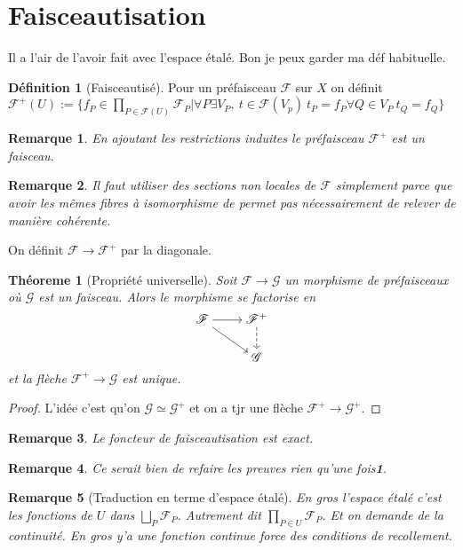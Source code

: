 \documentclass[a4paper,12pt]{book}
\newcommand{\F}{\mathscr F}
\newcommand{\G}{\mathscr{G}}
\theoremstyle{plain}
\newtheorem{thm}[subsection]{Théoreme}
\newtheorem{rem}{Remarque}
\theoremstyle{definition}
\newtheorem{defn}[subsection]{Définition}
\theoremstyle{remark}
\begin{document}
\section{Faisceautisation}
Il a l'air de l'avoir fait avec l'espace étalé. Bon je peux garder
ma déf habituelle. 
\begin{defn}[Faisceautisé]
    Pour un préfaisceau $\F$ sur $X$ on définit
    $\F^+(U):=\{f_{P}\in \prod_{P\in \F(U)} \F_{P}| \forall P \exists V_P,~t\in \F(V_p)~t_P=f_P\forall Q\in V_P~t_Q=f_Q\}$
\end{defn}
\begin{rem}
    En ajoutant les restrictions induites le préfaisceau $\F^+$ est un 
    faisceau.
\end{rem}
\begin{rem}
    Il faut utiliser des sections non locales de $\F$ simplement parce 
    que avoir les mêmes fibres à isomorphisme de permet pas 
    nécessairement de relever de manière cohérente.
\end{rem}
On définit $\F\to \F^+$ par la diagonale.
\begin{thm}[Propriété universelle]
    Soit $\F\to \G$ un morphisme de préfaisceaux où $\G$ est un 
    faisceau. Alors le morphisme se factorise en
\[\begin{tikzcd}[ampersand replacement=\&,cramped]
	{\mathscr F} \& {\mathscr F^+} \\
	\& {\mathscr G}
	\arrow[from=1-1, to=1-2]
	\arrow[from=1-1, to=2-2]
	\arrow[dashed, from=1-2, to=2-2]
\end{tikzcd}\]
 et la flèche $\F^+\to \G$ est unique.
\end{thm}
\begin{proof}
    L'idée c'est qu'on $\G\simeq \G^+$ et on a tjr une flèche 
    $\F^+\to\G^+$.
\end{proof}
\begin{rem}
    Le foncteur de faisceautisation est exact.
\end{rem}

\begin{rem}
    Ce serait bien de refaire les preuves rien qu'une fois\textbf{1}.
\end{rem}
\begin{rem}[Traduction en terme d'espace étalé]
    En gros l'espace étalé c'est les fonctions de $U$ dans $\bigsqcup_P
    \F_P$.
    Autrement dit $\prod_{P\in U} \F_P$. Et on demande de la continuité.
    En gros y'a une fonction continue force des conditions de 
    recollement.
\end{rem}
\end{document}
